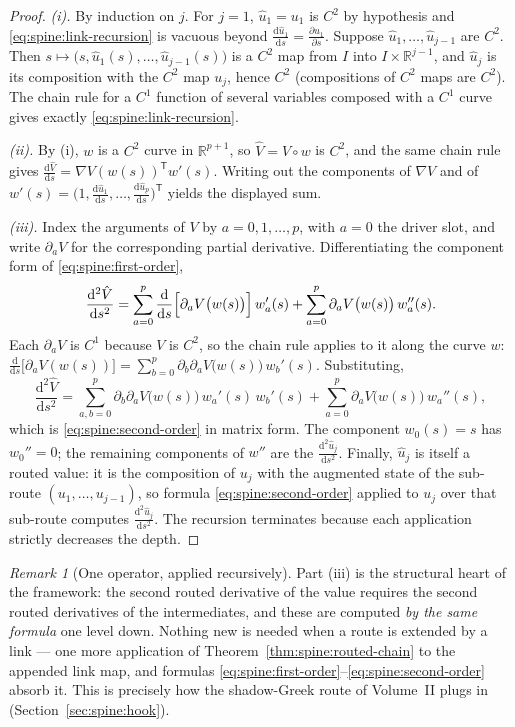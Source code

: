 \documentclass[11pt]{book}
\theoremstyle{plain}
\theoremstyle{definition}
\theoremstyle{remark}
\newtheorem{remark}[theorem]{Remark}
\newcommand{\dd}{\mathrm{d}}                                  %
\newcommand{\pd}[2]{\frac{\partial #1}{\partial #2}}          %
\newcommand{\td}[2]{\frac{\dd #1}{\dd #2}}                    %
\begin{document}
\begin{proof}
\emph{(i).} By induction on $j$. For $j = 1$, $\hat u_1 = u_1$ is $C^2$ by
hypothesis and \eqref{eq:spine:link-recursion} is vacuous beyond
$\td{\hat u_1}{s} = \pd{u_1}{s}$. Suppose $\hat u_1, \ldots, \hat u_{j-1}$ are
$C^2$. Then $s \mapsto \bigl(s, \hat u_1(s), \ldots, \hat u_{j-1}(s)\bigr)$ is
a $C^2$ map from $I$ into $I \times \mathbb{R}^{j-1}$, and $\hat u_j$ is its
composition with the $C^2$ map $u_j$, hence $C^2$
(compositions of $C^2$ maps are $C^2$). The chain rule for a $C^1$ function of
several variables composed with a $C^1$ curve gives exactly
\eqref{eq:spine:link-recursion}.

\emph{(ii).} By (i), $w$ is a $C^2$ curve in $\mathbb{R}^{p+1}$, so
$\hat V = V \circ w$ is $C^2$, and the same chain rule gives
$\td{\hat V}{s} = \nabla V(w(s))^{\mathsf T} w'(s)$. Writing out the
components of $\nabla V$ and of
$w'(s) = \bigl(1, \td{\hat u_1}{s}, \ldots, \td{\hat u_p}{s}\bigr)^{\mathsf T}$
yields the displayed sum.

\emph{(iii).} Index the arguments of $V$ by $a = 0, 1, \ldots, p$, with $a=0$
the driver slot, and write $\partial_a V$ for the corresponding partial
derivative. Differentiating the component form of
\eqref{eq:spine:first-order},
\[
  \frac{\dd^2 \hat V}{\dd s^2}
  = \sum_{a=0}^{p} \td{}{s}\Bigl[\partial_a V\bigl(w(s)\bigr)\Bigr]\, w_a'(s)
    + \sum_{a=0}^{p} \partial_a V\bigl(w(s)\bigr)\, w_a''(s).
\]
Each $\partial_a V$ is $C^1$ because $V$ is $C^2$, so the chain rule applies
to it along the curve $w$:
$\td{}{s}\bigl[\partial_a V(w(s))\bigr]
 = \sum_{b=0}^{p} \partial_b \partial_a V\bigl(w(s)\bigr)\, w_b'(s)$.
Substituting,
\[
  \frac{\dd^2 \hat V}{\dd s^2}
  = \sum_{a,b=0}^{p} \partial_b \partial_a V\bigl(w(s)\bigr)\,
    w_a'(s)\, w_b'(s)
    + \sum_{a=0}^{p} \partial_a V\bigl(w(s)\bigr)\, w_a''(s),
\]
which is \eqref{eq:spine:second-order} in matrix form. The component $w_0(s) = s$
has $w_0'' = 0$; the remaining components of $w''$ are the
$\frac{\dd^2 \hat u_j}{\dd s^2}$. Finally, $\hat u_j$ is itself a routed value:
it is the composition of $u_j$ with the augmented state of the sub-route
$(u_1, \ldots, u_{j-1})$, so formula \eqref{eq:spine:second-order} applied to
$u_j$ over that sub-route computes $\frac{\dd^2 \hat u_j}{\dd s^2}$. The
recursion terminates because each application strictly decreases the depth.
\end{proof}

\begin{remark}[One operator, applied recursively]\label{rem:spine:self-similar}
Part (iii) is the structural heart of the framework: the second routed
derivative of the value requires the second routed derivatives of the
intermediates, and these are computed \emph{by the same formula} one level
down. Nothing new is needed when a route is extended by a link --- one more
application of Theorem~\ref{thm:spine:routed-chain} to the appended link map,
and formulas \eqref{eq:spine:first-order}--\eqref{eq:spine:second-order}
absorb it. This is precisely how the shadow-Greek route of Volume~II plugs in
(Section~\ref{sec:spine:hook}).
\end{remark}
\end{document}
